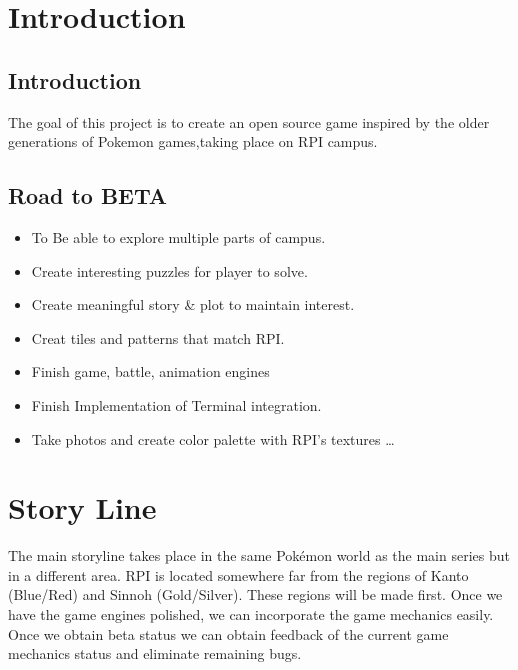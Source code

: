 \documentclass[11pt,fleqn]{book} %
\begin{document}

\chapter{Introduction}

\section{Introduction}

  \vspace{1em}
The goal of this project is to create an open source game inspired by the older generations of Pokemon games,taking place on RPI campus.

  \vspace{2em}

\section{Road to BETA}

  \vspace{1em}
  	\begin{itemize}
		\item To Be able to explore multiple parts of campus.
  		\item Create interesting puzzles for player to solve.
  		\item Create meaningful story \& plot to maintain interest. 
        \item Creat tiles and patterns that match RPI.
  		\item Finish game, battle, animation engines
  		\item Finish Implementation of Terminal integration.
        \item Take photos and create color palette with RPI’s textures
        \ldots
	\end{itemize}
\newpage


\chapter{Story Line}
\vspace{1em}
\indent The main storyline takes place in the same Pokémon world as the main series but in a different area. RPI is located somewhere far from the regions of Kanto (Blue/Red) and Sinnoh (Gold/Silver). These regions will be made first. Once we have the game engines polished, we can incorporate the game mechanics easily. Once we obtain beta status we can obtain feedback of the current game mechanics status and eliminate remaining bugs.
\end{document}
